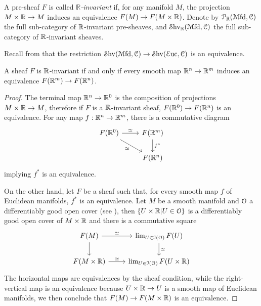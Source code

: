 \documentclass[10pt]{amsart}
\begin{document}
\begin{definition}
  A pre-sheaf $F$ is called \emph{$\mathbb{R}$-invariant} if, for any manifold $M$, the projection $M\times\mathbb{R}\to M$ induces an equivalence $F(M)\to F(M\times\mathbb{R})$. Denote by $\mathcal{P}_{\mathbb{R}}(\mathcal{M}\mathrm{fd},\mathcal{C})$ the full sub-category of $\mathbb{R}$-invariant pre-sheaves, and $\mathcal{S}\mathrm{hv}_{\mathbb{R}}(\mathcal{M}\mathrm{fd},\mathcal{C})$ the full sub-category of $\mathbb{R}$-invariant sheaves. 
\end{definition}
Recall from \cite{berkenhagen2025diffcoh3} that the restriction $\mathcal{S}\mathrm{hv}(\mathcal{M}\mathrm{fd},\mathcal{C})\to\mathcal{S}\mathrm{hv}(\mathcal{E}\mathrm{uc},\mathcal{C})$ is an equivalence. 
\begin{lemma}\label{lem:inv}
  A sheaf $F$ is $\mathbb{R}$-invariant if and only if every smooth map $\mathbb{R}^n\to\mathbb{R}^m$ induces an equivalence $F(\mathbb{R}^m)\to F(\mathbb{R}^n)$. 
\end{lemma}
\begin{proof}
  The terminal map $\mathbb{R}^n\to\mathbb{R}^0$ is the composition of projections $M\times\mathbb{R}\to M$, therefore if $F$ is a $\mathbb{R}$-invariant sheaf, $F(\mathbb{R}^0)\to F(\mathbb{R}^n)$ is an equivalence. For any map $f:\mathbb{R}^n\to\mathbb{R}^m$, there is a commutative diagram \begin{equation}
    \begin{tikzcd}
      F(\bR^0) \arrow[rd,"\simeq"'] \arrow[r,"\simeq"] & F(\bR^m) \arrow[d,"f^*"] \\
      & F(\bR^n)
    \end{tikzcd}
  \end{equation}implying $f^*$ is an equivalence. 

  On the other hand, let $F$ be a sheaf such that, for every smooth map $f$ of Euclidean manifolds, $f^*$ is an equivalence. Let $M$ be a smooth manifold and $\mathcal{O}$ a differentiably good open cover (see \cite[Theorem 5.4]{nanto2025diffcoh4}), then $\{U\times\mathbb{R}|U\in\mathcal{O}\}$ is a differentiably good open cover of $M\times\mathbb{R}$ and there is a commutative square \begin{equation}
    \begin{tikzcd}
      F(M) \arrow[r,"\simeq"] \arrow[d] & \lim_{U\in\lI(\lO)}F(U) \arrow[d,"\simeq"] \\
      F(M\times\bR) \arrow[r,"\simeq"] & \lim_{U\in\lI(\lO)} F(U\times\bR) 
    \end{tikzcd}
  \end{equation}The horizontal maps are equivalences by the sheaf condition, while the right-vertical map is an equivalence because $U\times\mathbb{R}\to U$ is a smooth map of Euclidean manifolds, we then conclude that $F(M)\to F(M\times\mathbb{R})$ is an equivalence. 
\end{proof}
\end{document}
